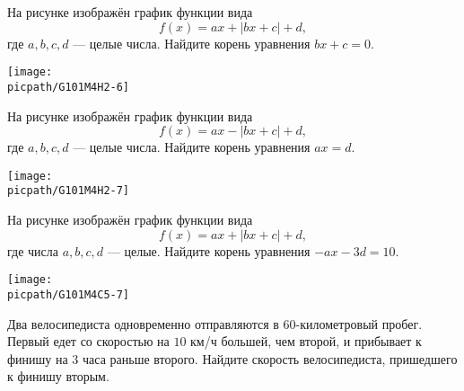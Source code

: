 %
%

\begin{class}[number=1]
	\begin{listofex}
		\item
		\begin{minipage}[t]{\bodywidth}
			На рисунке изображён график функции вида \[ f(x)=ax+|bx+c|+d, \] где \(a, b, c, d\) --- целые числа. Найдите корень уравнения \(bx+c=0\).
		\end{minipage}
		\hspace{0.02\linewidth}
		\begin{minipage}[t]{\picwidth}
			\texttt{[image: \\picpath/G101M4H2-6]}
		\end{minipage}
		\item
		\begin{minipage}[t]{\bodywidth}
			На рисунке изображён график функции вида \[ f(x)=ax-|bx+c|+d, \] где \(a, b, c, d\) --- целые числа. Найдите корень уравнения \(ax=d\).
		\end{minipage}
		\hspace{0.02\linewidth}
		\begin{minipage}[t]{\picwidth}
			\texttt{[image: \\picpath/G101M4H2-7]}
		\end{minipage}
		\item
		\begin{minipage}[t]{\bodywidth}
			На рисунке изображён график функции вида \[ f(x)=ax+|bx+c|+d, \] где числа \(a, b, c, d\) --- целые. Найдите корень уравнения \(-ax-3d=10\).
		\end{minipage}
		\hspace{0.02\linewidth}
		\begin{minipage}[t]{\picwidth}
			\texttt{[image: \\picpath/G101M4C5-7]}
		\end{minipage}
		\item Два велосипедиста одновременно отправляются в \( 60 \)-километровый пробег. Первый едет со скоростью на \( 10 \) км/ч большей, чем второй, и прибывает к финишу на \( 3 \) часа раньше второго. Найдите скорость велосипедиста, пришедшего к финишу вторым.
	\end{listofex}
\end{class}

